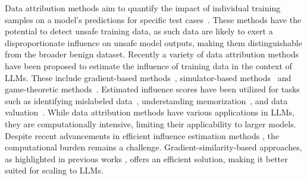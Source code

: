 Data attribution methods aim to quantify the impact of individual training samples on a model's predictions for specific test cases~\citep{koh2020understandingblackboxpredictionsinfluence}. These methods have the potential to detect unsafe training data, as such data are likely to exert a disproportionate influence on unsafe model outputs, making them distinguishable from the broader benign dataset. Recently a variety of data attribution methods have been proposed to estimate the influence of training data in the context of LLMs. These include gradient-based methods~\citep{xia2024lessselectinginfluentialdata,kwon2024datainfefficientlyestimatingdata}, simulator-based methods~\citep{guu2023simfluencemodelinginfluenceindividual,chai2024trainingdatainfluencegpt} and game-theoretic methods~\citep{wang2024datashapleytrainingrun,wang2024helpfulharmfuldatafinetuningfree}.
Estimated influence scores have been utilized for tasks such as identifying mislabeled data~\citep{pruthi2020estimatingtrainingdatainfluence}, understanding memorization~\citep{feldman2020neuralnetworksmemorizewhy}, and data valuation~\citep{choe2024dataworthgptllmscale}. 
While data attribution methods have various applications in LLMs, they are computationally intensive, limiting their applicability to larger models. Despite recent advancements in efficient influence estimation methods \cite{kwon2024datainfefficientlyestimatingdata}, the computational burden remains a challenge. Gradient-similarity-based approaches, as highlighted in previous works \cite{xia2024lessselectinginfluentialdata,pruthi2020estimatingtrainingdatainfluence}, offers an efficient solution, making it better suited for scaling to LLMs.